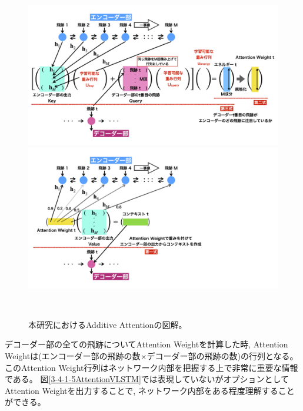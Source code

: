\begin{figure}[htbp]
 \centering
   \begin{minipage}{1.0\textwidth}
    \centering
    \includegraphics[width=1.0\textwidth, clip]{Figure/3Networks/3-4-1-6Attention.png}
   \end{minipage}
   
   \begin{minipage}{1.0\textwidth}
   \centering
    \includegraphics[width=1.0\textwidth, clip]{Figure/3Networks/3-4-1-7Attention.png}
   \end{minipage}
  \caption[本研究におけるAdditive Attentionの図解]{本研究におけるAdditive Attentionの図解。}
  \label{3-4-1-6Attention}
\end{figure}


デコーダー部の全ての飛跡についてAttention Weightを計算した時, Attention Weightは(エンコーダー部の飛跡の数$\times$デコーダー部の飛跡の数)の行列となる。
このAttention Weight行列はネットワーク内部を把握する上で非常に重要な情報である。
図\ref{3-4-1-5AttentionVLSTM}では表現していないがオプションとしてAttention Weightを出力することで, ネットワーク内部をある程度理解することができる。

